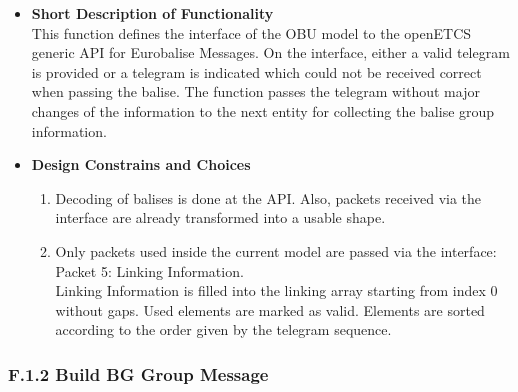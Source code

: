 \documentclass{template/openetcs_article}
\begin{document}
\begin{itemize}
\item \textbf{Short Description of Functionality}\\
This function defines the interface of the OBU model to the openETCS generic API for Eurobalise Messages. On the interface, either a valid telegram is provided or a telegram is indicated which could not be received correct when passing the balise. The function passes the telegram without major changes of the information to the next entity for collecting the balise group information.
	
\item \textbf{Design Constrains and Choices}\\
\begin{enumerate}
\item Decoding of balises is done at the API. Also, packets received via the interface are already transformed into a usable shape.
\item Only packets used inside the current model are passed via the interface:\\
Packet 5: Linking Information.\\
Linking Information is filled into the linking array starting from index 0 without gaps. Used elements are marked as valid. Elements are sorted according to the order given by the telegram sequence.
\end{enumerate}
\end{itemize}


\subsubsection{F.1.2 Build BG Group Message}
\end{document}
